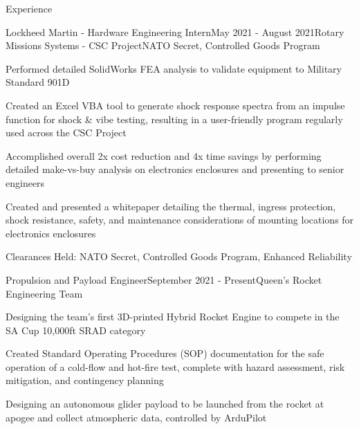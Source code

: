 \documentclass{resume} %
\begin{document}
\begin{rSection}{Experience}

\begin{rSubsection}{Lockheed Martin - Hardware Engineering Intern}{May 2021 - August 2021}{Rotary Missions Systems - CSC Project}{NATO Secret, Controlled Goods Program}

\item Performed detailed SolidWorks FEA analysis to validate equipment to Military Standard 901D
\item Created an Excel VBA tool to generate shock response spectra from an impulse function for shock \& vibe testing, resulting in a user-friendly program regularly used across the CSC Project
\item Accomplished overall 2x cost reduction and 4x time savings by performing detailed make-vs-buy analysis on electronics enclosures and presenting to senior engineers
\item Created and presented a whitepaper detailing the thermal, ingress protection, shock resistance, safety, and maintenance considerations of mounting locations for electronics enclosures
\item Clearances Held: NATO Secret, Controlled Goods Program, Enhanced Reliability

\begin{rSubsection}{Propulsion and Payload Engineer}{September 2021 - Present}{Queen's Rocket Engineering Team}{}
\item Designing the team's first 3D-printed Hybrid Rocket Engine to compete in the SA Cup 10,000ft SRAD category
\item Created Standard Operating Procedures (SOP) documentation for the safe operation of a cold-flow and hot-fire test, complete with hazard assessment, risk mitigation, and contingency planning
\item Designing an autonomous glider payload to be launched from the rocket at apogee and collect atmospheric data, controlled by ArduPilot

\end{rSubsection}

\end{rSubsection}

\begin{comment}

\begin{rSubsection}{Department of National Defense - Engineering Intern}{May 2020 - September 2020}{}{}

\item Documented and presented key specifications on armored patrol vehicles for 411 vehicles in 69 variants
\item Reworked procurement documents based on technical requirements from multiple military bases
\item Proofread english-to-french translations of contracts to ensure correctness

\end{rSubsection}
\end{comment}
\end{rSection}
\end{document}
